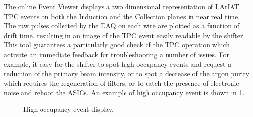 The online Event Viewer displays a two dimensional representation of LArIAT TPC events on both the Induction and the Collection planes in near real time. The raw pulses collected by the DAQ on each wire are plotted as a function of drift time, resulting in an image of the TPC event easily readable by the shifter. This tool guarantees a particularly good  check of the TPC operation which activate an immediate feedback for troubleshooting a number of issues. For example,  it easy for the shifter to spot high occupancy events and request a reduction of the primary beam intensity, or to spot a decrease of the argon purity which requires the regeneration of filters, or to catch the presence of electronic noise and reboot the ASICs. An example of high occupancy event is shown in \ref{fig:highOcc}.

\begin{figure}[htb]
\centering
\caption{High occupancy event display.}
\label{fig:highOcc}
\end{figure}


